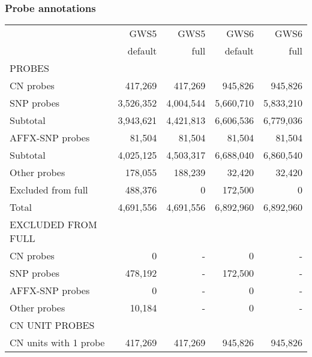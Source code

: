 \documentclass[10pt,a4paper]{article}
\newcommand{\GWSFive}{GWS5\xspace}
\newcommand{\GWSSix}{GWS6\xspace}
\begin{document}
\subsubsection{Probe annotations}
\begin{table}[hp]
\begin{center}
\begin{tabular}{|l|rr||rr|}
\hline
                        &  \GWSFive &  \GWSFive &   \GWSSix  &   \GWSSix \\
                        &  default  &  full        & default &   full    \\
\hline
\hline

PROBES                  &           &           &            &           \\
CN probes               &   417,269 &   417,269 &    945,826 &   945,826 \\
SNP probes              & 3,526,352 & 4,004,544 &  5,660,710 & 5,833,210 \\
Subtotal                & 3,943,621 & 4,421,813 &  6,606,536 & 6,779,036 \\
AFFX-SNP probes         &    81,504 &    81,504 &     81,504 &    81,504 \\
Subtotal                & 4,025,125 & 4,503,317 &  6,688,040 & 6,860,540 \\
Other probes            &   178,055 &   188,239 &     32,420 &    32,420 \\
Excluded from full      &   488,376 &         0 &    172,500 &         0 \\
Total                   & 4,691,556 & 4,691,556 &  6,892,960 & 6,892,960 \\
\hline									            						             
EXCLUDED FROM FULL      &           &           &            &           \\
CN probes               &        0  &        -  &         0  &         - \\
SNP probes              &  478,192  &        -  &   172,500  &         - \\
AFFX-SNP probes         &        0  &        -  &         0  &         - \\
Other probes            &   10,184  &        -  &         0  &         - \\
\hline									            						             
CN UNIT PROBES           &	  	     &	  			 &	 				 &	 				 \\
CN units with 1 probe    & 417,269  &  417,269  &   945,826 &   945,826 \\

\end{tabular}
\end{center}
\end{table}
\end{document}
